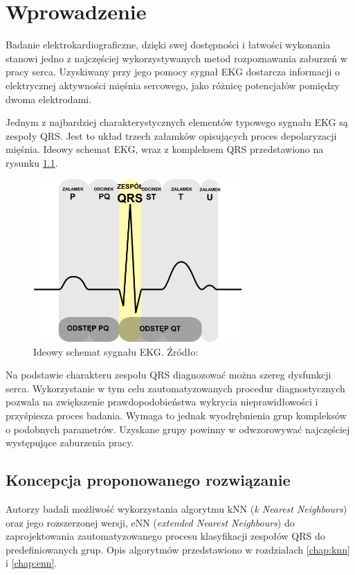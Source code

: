 \chapter{Wprowadzenie}
Badanie elektrokardiograficzne, dzięki swej dostępności i łatwości wykonania stanowi jedno z najczęściej wykorzystywanych metod rozpoznawania zaburzeń w pracy serca. Uzyskiwany przy jego pomocy sygnał EKG dostarcza informacji o elektrycznej aktywności mięśnia sercowego, jako różnicę potencjałów pomiędzy dwoma elektrodami.

Jednym z najbardziej charakterystycznych elementów typowego sygnału EKG są zespoły QRS. Jest to układ trzech załamków opisujących proces depolaryzacji mięśnia. Ideowy schemat EKG, wraz z kompleksem QRS przedstawiono na rysunku \ref{fig:qrs-complex}.


\begin{figure}[H]
	\centering
	\includegraphics[width=8cm]{img/qrs-complex}
	\caption{Ideowy schemat sygnału EKG. Źródło: \cite{qrs-wiki}}
	\label{fig:qrs-complex}
\end{figure}

Na podstawie charakteru zespołu QRS diagnozować można szereg dysfunkcji serca. Wykorzystanie w tym celu zautomatyzowanych procedur diagnostycznych pozwala na zwiększenie prawdopodobieństwa wykrycia nieprawidłowości i przyśpiesza proces badania. Wymaga to jednak wyodrębnienia grup kompleksów o podobnych parametrów. Uzyskane grupy powinny w odwzorowywać najczęściej występujące zaburzenia pracy.

\section{Koncepcja proponowanego rozwiązanie}

Autorzy badali możliwość wykorzystania algorytmu kNN (\textit{k Nearest Neighbours}) oraz jego rozszerzonej wersji, eNN (\textit{extended Nearest Neighbours}) do zaprojektowania zautomatyzowanego procesu klasyfikacji zespołów QRS do predefiniowanych grup. Opis algorytmów przedstawiono w rozdziałach \ref{chap:knn} i \ref{chap:enn}.

